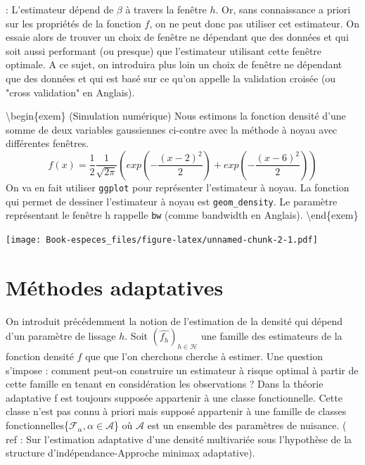 \documentclass[
]{book}
\begin{document}
\begin{cmtr}: L'estimateur dépend de $\beta$ à travers la fenêtre $h$. Or, sans   connaissance a priori sur les propriétés de la fonction $f$, on ne peut donc pas utiliser cet estimateur. On essaie alors de trouver un choix de fenêtre ne dépendant que des données et qui soit aussi performant (ou presque) que l'estimateur utilisant cette fenêtre optimale. A ce sujet, on introduira plus loin un choix de fenêtre ne dépendant que des données et qui est basé sur ce qu'on appelle la validation croisée (ou "cross validation" en Anglais).  \newline
\end{cmtr}

\textbackslash begin\{exem\} (Simulation numérique)
Nous estimons la fonction densité d'une somme de deux variables gaussiennes ci-contre avec la méthode à noyau avec différentes fenêtres.
\[
f(x)=\frac{1}{2}\frac{1}{\sqrt{2\pi}}(exp(-\frac{(x-2)^2}{2})+exp(-\frac{(x-6)^2}{2}))
\]
On va en fait utiliser \texttt{ggplot} pour représenter l'estimateur à noyau. La fonction qui permet de dessiner l'estimateur à noyau est \texttt{geom\_density}. Le paramètre représentant le fenêtre h rappelle \texttt{bw} (comme bandwidth en Anglais).
\textbackslash end\{exem\}

\texttt{[image: Book-especes\_files/figure-latex/unnamed-chunk-2-1.pdf]}

\hypertarget{muxe9thodes-adaptatives}{%
\section{Méthodes adaptatives}\label{muxe9thodes-adaptatives}}

\hspace*{0.5cm} On introduit précédemment la notion de l'estimation de la densité qui dépend d'un paramètre de lissage \(h\). Soit \((\hat{f_h})_{h\in \mathcal H}\) une famille des estimateurs de la fonction densité \(f\) que que l'on cherchons cherche à estimer.\newline
Une question s'impose : comment peut-on construire un estimateur à risque optimal à partir de cette famille en tenant en considération les observations ? \newline
Dans la théorie adaptative f est toujours supposée appartenir à une classe fonctionnelle. Cette classe n'est pas connu à priori mais supposé appartenir à une famille de classes fonctionnelles\{\(\mathcal{F_{\alpha}},\alpha \in\mathcal{A}\)\} où \(\mathcal{A}\) est un ensemble des paramètres de nuisance. ( ref : Sur l'estimation adaptative d'une densité multivariée sous l'hypothèse de la structure d'indépendance-Approche minimax adaptative).\newline
\end{document}
